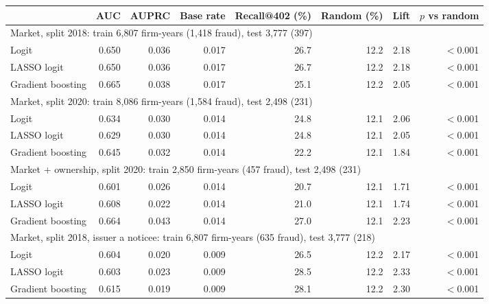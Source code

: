 \begin{tabular*}{\textwidth}[]{l@{\extracolsep\fill}rrrrrrr}
\toprule
 & AUC & AUPRC & Base rate & Recall@402 (\%) & Random (\%) & Lift & $p$ vs random\\
\midrule
\multicolumn{8}{l}{Market, split 2018: train 6,807 firm-years (1,418 fraud), test 3,777 (397)}\\
Logit & 0.650 & 0.036 & 0.017 & 26.7 & 12.2 & 2.18 & $<$0.001\\
LASSO logit & 0.650 & 0.036 & 0.017 & 26.7 & 12.2 & 2.18 & $<$0.001\\
Gradient boosting & 0.665 & 0.038 & 0.017 & 25.1 & 12.2 & 2.05 & $<$0.001\\
\midrule
\multicolumn{8}{l}{Market, split 2020: train 8,086 firm-years (1,584 fraud), test 2,498 (231)}\\
Logit & 0.634 & 0.030 & 0.014 & 24.8 & 12.1 & 2.06 & $<$0.001\\
LASSO logit & 0.629 & 0.030 & 0.014 & 24.8 & 12.1 & 2.05 & $<$0.001\\
Gradient boosting & 0.645 & 0.032 & 0.014 & 22.2 & 12.1 & 1.84 & $<$0.001\\
\midrule
\multicolumn{8}{l}{Market + ownership, split 2020: train 2,850 firm-years (457 fraud), test 2,498 (231)}\\
Logit & 0.601 & 0.026 & 0.014 & 20.7 & 12.1 & 1.71 & $<$0.001\\
LASSO logit & 0.608 & 0.022 & 0.014 & 21.0 & 12.1 & 1.74 & $<$0.001\\
Gradient boosting & 0.664 & 0.043 & 0.014 & 27.0 & 12.1 & 2.23 & $<$0.001\\
\midrule
\multicolumn{8}{l}{Market, split 2018, issuer a noticee: train 6,807 firm-years (635 fraud), test 3,777 (218)}\\
Logit & 0.604 & 0.020 & 0.009 & 26.5 & 12.2 & 2.17 & $<$0.001\\
LASSO logit & 0.603 & 0.023 & 0.009 & 28.5 & 12.2 & 2.33 & $<$0.001\\
Gradient boosting & 0.615 & 0.019 & 0.009 & 28.1 & 12.2 & 2.30 & $<$0.001\\
\bottomrule
\end{tabular*}
